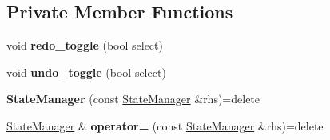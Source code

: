 \subsection*{Private Member Functions}
\begin{DoxyCompactItemize}
\item 
void {\bfseries redo\+\_\+toggle} (bool select)\hypertarget{classimage__tools_1_1StateManager_af5b298291a12460eb3ab6c7af9c16e70}{}\label{classimage__tools_1_1StateManager_af5b298291a12460eb3ab6c7af9c16e70}

\item 
void {\bfseries undo\+\_\+toggle} (bool select)\hypertarget{classimage__tools_1_1StateManager_ab617fd412a4fa0d757cd96f5bf836dd0}{}\label{classimage__tools_1_1StateManager_ab617fd412a4fa0d757cd96f5bf836dd0}

\item 
{\bfseries State\+Manager} (const \hyperlink{classimage__tools_1_1StateManager}{State\+Manager} \&rhs)=delete\hypertarget{classimage__tools_1_1StateManager_ab3202a4aaa1fbf6415597218f6182530}{}\label{classimage__tools_1_1StateManager_ab3202a4aaa1fbf6415597218f6182530}

\item 
\hyperlink{classimage__tools_1_1StateManager}{State\+Manager} \& {\bfseries operator=} (const \hyperlink{classimage__tools_1_1StateManager}{State\+Manager} \&rhs)=delete\hypertarget{classimage__tools_1_1StateManager_a84c8b7a722a9e41da3569ad1d3a05f21}{}\label{classimage__tools_1_1StateManager_a84c8b7a722a9e41da3569ad1d3a05f21}

\end{DoxyCompactItemize}
